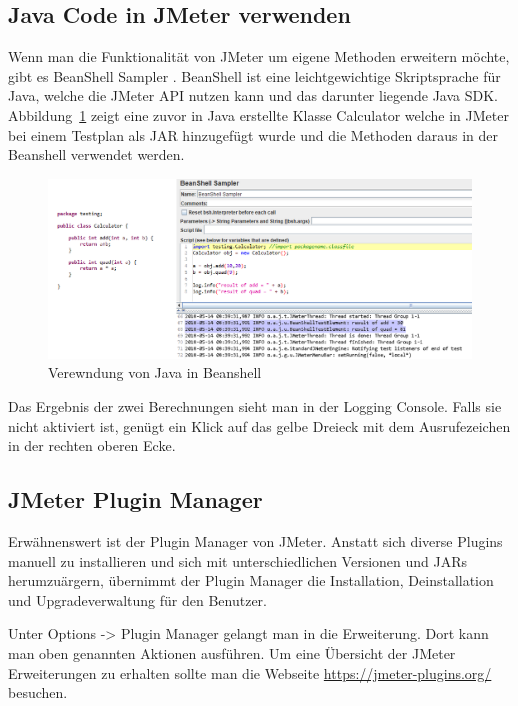 \documentclass[a4paper,12pt]{article}
\begin{document}
\subsection{Java Code in JMeter verwenden}
Wenn man die Funktionalität von JMeter um eigene Methoden erweitern möchte, gibt es BeanShell Sampler \cite{online:beanshell}. BeanShell ist eine leichtgewichtige Skriptsprache für Java, welche die JMeter API nutzen kann und das darunter liegende Java SDK. Abbildung~\ref{fig:beanshell} zeigt eine zuvor in Java erstellte Klasse Calculator welche in JMeter bei einem Testplan als JAR hinzugefügt wurde und die Methoden daraus in der Beanshell verwendet werden.

\begin{figure}[htb]%
 \centering
    \includegraphics[width=1\textwidth]{bilder/beanshell.png}
  \caption{Verewndung von Java in Beanshell}
  \label{fig:beanshell}
\end{figure}

Das Ergebnis der zwei Berechnungen sieht man in der Logging Console. Falls sie nicht aktiviert ist, genügt ein Klick auf das gelbe Dreieck mit dem Ausrufezeichen in der rechten oberen Ecke.

\subsection{JMeter Plugin Manager}
Erwähnenswert ist der Plugin Manager von JMeter. Anstatt sich diverse Plugins manuell zu installieren und sich mit unterschiedlichen Versionen und JARs herumzuärgern, übernimmt der Plugin Manager die Installation, Deinstallation und Upgradeverwaltung für den Benutzer. \cite{online:jmeter}

Unter Options -> Plugin Manager gelangt man in die Erweiterung. Dort kann man oben genannten Aktionen ausführen. Um eine Übersicht der JMeter Erweiterungen zu erhalten sollte man die Webseite \url{https://jmeter-plugins.org/} besuchen.
\end{document}
